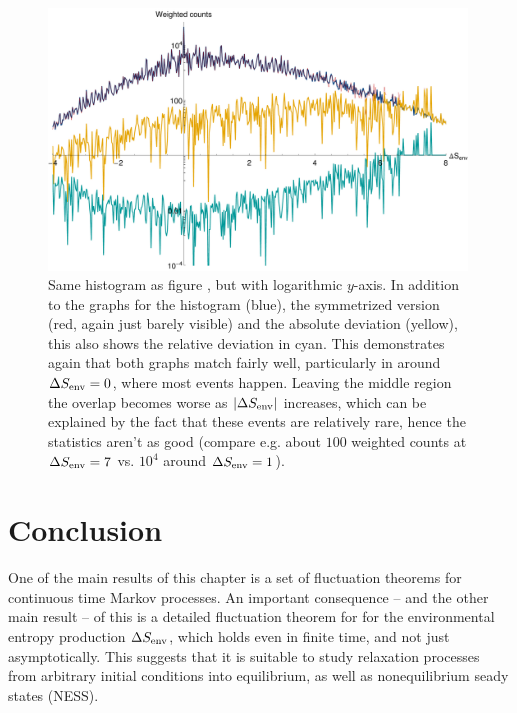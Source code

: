 \begin{figure}[htb]
	\centering
	\includegraphics[width=30em]{figures/histogram_log}
	\caption[]{Same histogram as figure , but with logarithmic \(y\)-axis. In addition to the graphs for the histogram ({\color{blue}blue}), the symmetrized version ({\color{red}red}, again just barely visible) and the absolute deviation ({\color{yellow}yellow}), this also shows the relative deviation in {\color{cyan}cyan}. This demonstrates again that both graphs match fairly well, particularly in around \(\Delta S_\text{env} = 0\), where most events happen. Leaving the middle region the overlap becomes worse as \(|\Delta S_\text{env}|\) increases, which can be explained by the fact that these events are relatively rare, hence the statistics aren't as good (compare e.g. about \(100\) weighted counts at \(\Delta S_\text{env} = 7\) vs. \(10^4\) around \(\Delta S_\text{env} = 1\)).}
	\label{fig:histogram_log}
\end{figure}







\section{Conclusion}

One of the main results of this chapter is a set of fluctuation theorems for continuous time Markov processes. An important consequence -- and the other main result -- of this is a detailed fluctuation theorem for for the environmental entropy production \(\Delta S_\text{env}\), which holds even in finite time, and not just asymptotically. This suggests that it is suitable to study relaxation processes from arbitrary initial conditions into equilibrium, as well as nonequilibrium seady states (NESS).

